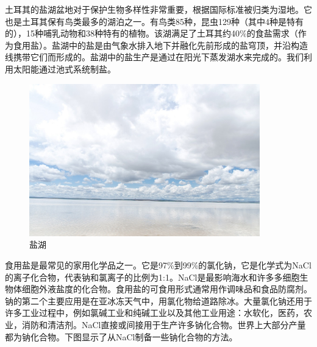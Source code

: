 土耳其的盐湖盆地对于保护生物多样性非常重要，根据国际标准被归类为湿地。它也是土耳其保有鸟类最多的湖泊之一。有鸟类85种，昆虫129种（其中4种是特有的），15种哺乳动物和38种特有的植物。该湖满足了土耳其约40\%的食盐需求（作为食用盐）。盐湖中的盐是由气象水排入地下并融化先前形成的盐穹顶，并沿构造线携带它们而形成的。盐湖中的盐生产是通过在阳光下蒸发湖水来完成的。我们利用太阳能通过池式系统制盐。

\begin{figure}[h]
	\centering
	\includegraphics[width=10cm]{./pic/t15-1.jpg}
	\caption*{盐湖}
\end{figure}

食用盐是最常见的家用化学品之一。它是97\%到99\%的氯化钠，它是化学式为NaCl的离子化合物，代表钠和氯离子的比例为1:1。NaCl是最影响海水和许多多细胞生物体细胞外液盐度的化合物。食用盐的可食用形式通常用作调味品和食品防腐剂。钠的第二个主要应用是在亚冰冻天气中，用氯化物给道路除冰。大量氯化钠还用于许多工业过程中，例如氯碱工业和纯碱工业以及其他工业用途：水软化，医药，农业，消防和清洁剂。NaCl直接或间接用于生产许多钠化合物。世界上大部分产量都为钠化合物。下图显示了从NaCl制备一些钠化合物的方法。

